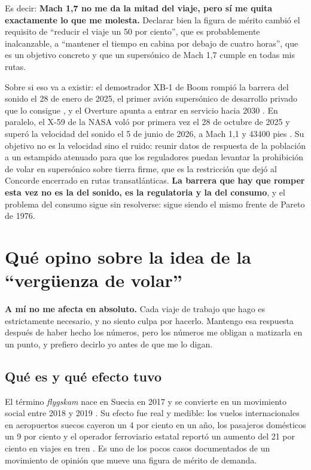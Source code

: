 \documentclass[11pt,letterpaper]{article}
\begin{document}
Es decir: \textbf{Mach 1,7 no me da la mitad del viaje, pero sí me quita
exactamente lo que me molesta.} Declarar bien la figura de mérito cambió el
requisito de \enquote{reducir el viaje un 50 por ciento}, que es probablemente
inalcanzable, a \enquote{mantener el tiempo en cabina por debajo de cuatro
horas}, que es un objetivo concreto y que un supersónico de Mach 1,7 cumple en
todas mis rutas.

Sobre si eso va a existir: el demostrador XB-1 de Boom rompió la barrera del
sonido el 28 de enero de 2025, el primer avión supersónico de desarrollo
privado que lo consigue \parencite{boom2025xb1}, y el Overture apunta a entrar
en servicio hacia 2030 \parencite{wikioverture}. En paralelo, el X-59 de la NASA
voló por primera vez el 28 de octubre de 2025 y superó la velocidad del sonido
el 5 de junio de 2026, a Mach 1,1 y \num{43400} pies
\parencite{nasa2025x59,nasa2026x59}. Su objetivo no es la velocidad sino el
ruido: reunir datos de respuesta de la población a un estampido atenuado para
que los reguladores puedan levantar la prohibición de volar en supersónico
sobre tierra firme, que es la restricción que dejó al Concorde encerrado en
rutas transatlánticas. \textbf{La barrera que hay que romper esta vez no es la
del sonido, es la regulatoria y la del consumo}, y el problema del consumo
sigue sin resolverse: sigue siendo el mismo frente de Pareto de 1976.

\section{Qué opino sobre la idea de la \enquote{vergüenza de volar}}
\label{sec:verguenza}

\textbf{A mí no me afecta en absoluto.} Cada viaje de trabajo que hago es
estrictamente necesario, y no siento culpa por hacerlo. Mantengo esa respuesta
después de haber hecho los números, pero los números me obligan a matizarla en
un punto, y prefiero decirlo yo antes de que me lo digan.

\subsection*{Qué es y qué efecto tuvo}

El término \emph{flygskam} nace en Suecia en 2017 y se convierte en un
movimiento social entre 2018 y 2019 \parencite{wikiflygskam}. Su efecto fue
real y medible: los vuelos internacionales en aeropuertos suecos cayeron un 4
por ciento en un año, los pasajeros domésticos un 9 por ciento y el operador
ferroviario estatal reportó un aumento del 21 por ciento en viajes en tren
\parencite{aiaa2020flygskam}. Es uno de los pocos casos documentados de un
movimiento de opinión que mueve una figura de mérito de demanda.
\end{document}
